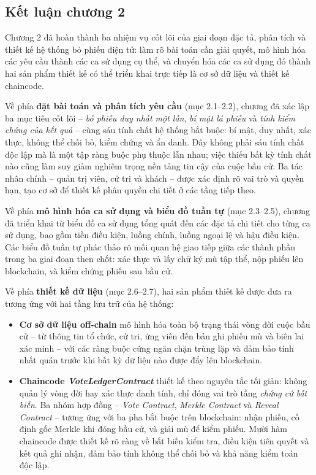 \subsection{Kết luận chương 2}

Chương 2 đã hoàn thành ba nhiệm vụ cốt lõi của giai đoạn đặc tả, phân tích và thiết kế hệ thống bỏ phiếu điện tử: làm rõ bài toán cần giải quyết, mô hình hóa các yêu cầu thành các ca sử dụng cụ thể, và chuyển hóa các ca sử dụng đó thành hai sản phẩm thiết kế có thể triển khai trực tiếp là cơ sở dữ liệu và thiết kế chaincode.

Về phía \textbf{đặt bài toán và phân tích yêu cầu} (mục 2.1--2.2), chương đã xác lập ba mục tiêu cốt lõi -- \textit{bỏ phiếu duy nhất một lần}, \textit{bí mật lá phiếu} và \textit{tính kiểm chứng của kết quả} -- cùng sáu tính chất hệ thống bắt buộc: bí mật, duy nhất, xác thực, không thể chối bỏ, kiểm chứng và ẩn danh. Đây không phải sáu tính chất độc lập mà là một tập ràng buộc phụ thuộc lẫn nhau; việc thiếu bất kỳ tính chất nào cũng làm suy giảm nghiêm trọng nền tảng tin cậy của cuộc bầu cử. Ba tác nhân chính -- quản trị viên, cử tri và khách -- được xác định rõ vai trò và quyền hạn, tạo cơ sở để thiết kế phân quyền chi tiết ở các tầng tiếp theo.

Về phía \textbf{mô hình hóa ca sử dụng và biểu đồ tuần tự} (mục 2.3--2.5), chương đã triển khai từ biểu đồ ca sử dụng tổng quát đến các đặc tả chi tiết cho từng ca sử dụng, bao gồm tiền điều kiện, luồng chính, luồng ngoại lệ và hậu điều kiện. Các biểu đồ tuần tự phác thảo rõ mối quan hệ giao tiếp giữa các thành phần trong ba giai đoạn then chốt: xác thực và lấy chữ ký mù tập thể, nộp phiếu lên blockchain, và kiểm chứng phiếu sau bầu cử.

Về phía \textbf{thiết kế dữ liệu} (mục 2.6--2.7), hai sản phẩm thiết kế được đưa ra tương ứng với hai tầng lưu trữ của hệ thống:

\begin{itemize}
    \item \textbf{Cơ sở dữ liệu off-chain} mô hình hóa toàn bộ trạng thái vòng đời cuộc bầu cử -- từ thông tin tổ chức, cử tri, ứng viên đến bản ghi phiếu mù và biên lai xác minh -- với các ràng buộc cứng ngăn chặn trùng lặp và đảm bảo tính nhất quán trước khi bất kỳ dữ liệu nào được đẩy lên blockchain.

    \item \textbf{Chaincode \textit{VoteLedgerContract}} thiết kế theo nguyên tắc tối giản: không quản lý vòng đời hay xác thực danh tính, chỉ đóng vai trò tầng \textit{chứng cứ bất biến}. Ba nhóm hợp đồng -- \textit{Vote Contract}, \textit{Merkle Contract} và \textit{Reveal Contract} -- tương ứng với ba pha bắt buộc trên blockchain: nhận phiếu, cố định gốc Merkle khi đóng bầu cử, và giải mù để kiểm phiếu. Mười hàm chaincode được thiết kế rõ ràng về bất biến kiểm tra, điều kiện tiên quyết và kết quả ghi nhận, đảm bảo tính không thể chối bỏ và khả năng kiểm toán độc lập.
\end{itemize}

